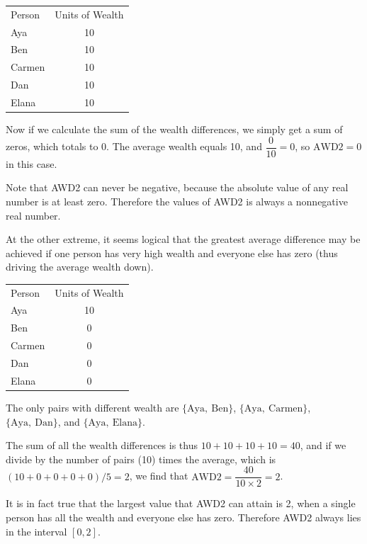 \documentclass[12pt]{memoir}\usepackage[]{graphicx}\usepackage[table]{xcolor}
\begin{document}
\begin{center}
\begin{tabular}{lc}
\toprule
Person & Units of Wealth \\
Aya & 10 \\ \midrule
Ben & 10 \\ \midrule
Carmen & 10 \\ \midrule
Dan & 10 \\ \midrule
Elana & 10 \\ \bottomrule
\end{tabular}
\end{center}

Now if we calculate the sum of the wealth differences, we simply get a sum 
of zeros, which totals to 0.  The average wealth equals 10, and $\dfrac{0}{10} = 0$,
so $\text{AWD2} = 0$ in this case. 

Note that AWD2 can never be negative, because the absolute value of any 
real number is at least zero.  Therefore the values of AWD2 is always 
a nonnegative real number. 

At the other extreme, it seems logical that the greatest average difference
may be achieved if one person has very high wealth and everyone else has 
zero (thus driving the average wealth down). 

\begin{center}
\begin{tabular}{lc}
\toprule
Person & Units of Wealth \\
Aya & 10 \\ \midrule
Ben & 0 \\ \midrule
Carmen & 0 \\ \midrule
Dan & 0 \\ \midrule
Elana & 0 \\ \bottomrule
\end{tabular}
\end{center}

The only pairs with different wealth are $\{\text{Aya},\ \text{Ben}\}$,
$\{\text{Aya},\ \text{Carmen}\}$, $\{\text{Aya},\ \text{Dan}\}$, and 
$\{\text{Aya},\ \text{Elana}\}$.  

The sum of all the wealth differences is thus $10 + 10 + 10 + 10 = 40$, and 
if we divide by the number of pairs (10) times the average, which is $(10 + 0 + 0 + 0 + 0)/5 = 2$,
we find that $\text{AWD2} = \dfrac{40}{10\times 2} = 2$.  

It is in fact true that the largest value that AWD2 can attain is 2, when a single
person has all the wealth and everyone else has zero.  Therefore AWD2 always lies
in the interval $[0, 2]$. 
\end{document}
